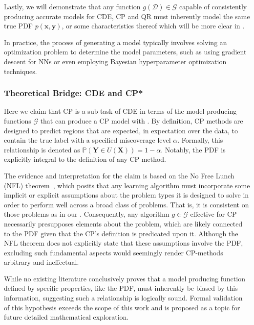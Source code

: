 Lastly, we will demonstrate that any function $g(\mathcal{D}) \in \mathcal{G}$ capable of consistently producing accurate models for CDE, CP and QR must inherently model the same true PDF $p(\mathbf{x}, \mathbf{y})$, or some characteristics thereof which will be more clear in .

In practice, the process of generating a model typically involves solving an optimization problem to determine the model parameters, such as using gradient descent for NNs or even employing Bayesian hyperparameter optimization techniques.

\subsubsection{Theoretical Bridge: CDE and CP*}\label{sec:bridge_cde_cp}

Here we claim that CP is a sub-task of CDE in terms of the model producing functions $\mathcal{G}$ that can produce a CP model with . By definition, CP methods are designed to predict regions that are expected, in expectation over the data, to contain the true label with a specified miscoverage level $\alpha$. Formally, this relationship is denoted as $\mathbb{P}(\mathbf{Y} \in U(\mathbf{X})) = 1 - \alpha$. Notably, the PDF is explicitly integral to the definition of any CP method.

The evidence and interpretation for the claim is based on the No Free Lunch (NFL) theorem~\cite{wolpert1997no}, which posits that any learning algorithm must incorporate some implicit or explicit assumptions about the problem types it is designed to solve in order to perform well across a broad class of problems. That is, it is consistent on those problems as in our . Consequently, any algorithm $g \in \mathcal{G}$ effective for CP necessarily presupposes elements about the problem, which are likely connected to the PDF given that the CP's definition is predicated upon it. Although the NFL theorem does not explicitly state that these assumptions involve the PDF, excluding such fundamental aspects would seemingly render CP-methods arbitrary and ineffectual.

While no existing literature conclusively proves that a model producing function defined by specific properties, like the PDF, must inherently be biased by this information, suggesting such a relationship is logically sound. Formal validation of this hypothesis exceeds the scope of this work and is proposed as a topic for future detailed mathematical exploration.

